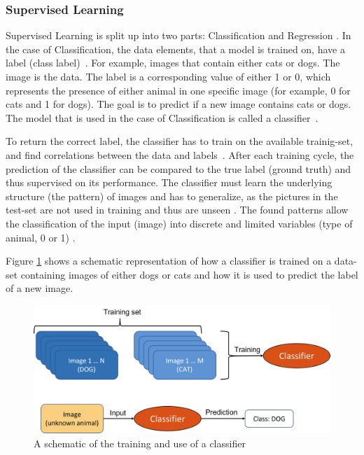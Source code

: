 \subsubsection*{Supervised Learning}\label{SUPER}
Supervised Learning is split up into two parts: Classification and Regression \cite{Janiesch,Theodoridis}.
In the case of Classification, the data elements, that a model is trained on, have a label (class label)~\cite{Carleo}. For example, images that contain either cats or dogs. The image is the data. The label is a corresponding value of either 1 or 0, which represents the presence of either animal in one specific image (for example, 0 for cats and 1 for dogs). The goal is to predict if a new image contains cats or dogs. The model that is used in the case of Classification is called a classifier~\cite{Theodoridis}.

To return the correct label, the classifier has to train on the available trainig-set, and find correlations between the data and labels~\cite{Carleo}. After each training cycle, the prediction of the classifier can be compared to the true label (ground truth) and thus supervised on its performance. The classifier must learn the underlying structure (the pattern) of images and has to generalize, as the pictures in the test-set are not used in training and thus are unseen \cite{Bishop}. 
The found patterns allow the classification of the input (image) into discrete and limited variables (type of animal, 0 or 1) \cite{Theodoridis}.

Figure \ref{fig:CATDOG} shows a schematic representation of how a classifier is trained on a data-set containing images of either dogs or cats and how it is used to predict the label of a new image.

\begin{figure}[H]
	\centering
	\includegraphics[width=0.9\linewidth]{IMGs/CATDOG.png}
	\caption{A schematic of the training and use of a classifier}
	\label{fig:CATDOG}
\end{figure}



